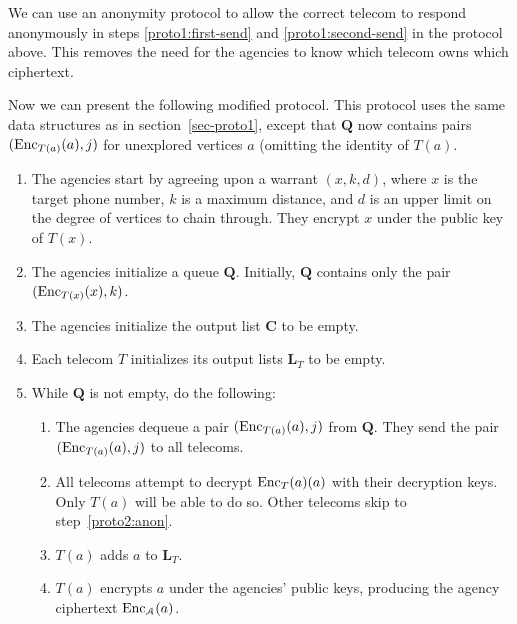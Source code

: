 We can use an anonymity protocol to allow the correct telecom to respond anonymously in steps \ref{proto1:first-send} and \ref{proto1:second-send} in the protocol above. This removes the need for the agencies to know which telecom owns which ciphertext.



Now we can present the following modified protocol. This protocol uses the same data structures as in section~\ref{sec-proto1}, except that $\mathbf{Q}$ now contains pairs $(\operatorname{Enc}_{T(a)}(a), j)$ for unexplored vertices $a$ (omitting the identity of $T(a)$.



\begin{enumerate}

\item The agencies start by agreeing upon a warrant $(x, k, d)$, where $x$ is the target phone number, $k$ is a maximum distance, and $d$ is an upper limit on the degree of vertices to chain through. They encrypt $x$ under the public key of $T(x)$.

\item The agencies initialize a queue $\mathbf{Q}$. Initially, $\mathbf{Q}$ contains only the pair $(\operatorname{Enc}_{T(x)}(x), k)$.

\item The agencies initialize the output list $\mathbf{C}$ to be empty.

\item Each telecom $T$ initializes its output lists $\mathbf{L}_T$ to be empty.

\item While $\mathbf{Q}$ is not empty, do the following:

\begin{enumerate}

\item \label{proto2:dequeue} The agencies dequeue a pair $(\operatorname{Enc}_{T(a)}(a), j)$ from $\mathbf{Q}$. They send the pair $(\operatorname{Enc}_{T(a)}(a), j)$ to all telecoms.

\item All telecoms attempt to decrypt $\operatorname{Enc}_T(a)(a)$ with their decryption keys. Only $T(a)$ will be able to do so. Other telecoms skip to step~\ref{proto2:anon}.

\item $T(a)$ adds $a$ to $\mathbf{L}_T$.

\item \label{proto2:agencycipher} $T(a)$ encrypts $a$ under the agencies' public keys, producing the agency ciphertext $\operatorname{Enc}_\mathcal{A}(a)$.


\end{enumerate}
\end{enumerate}

